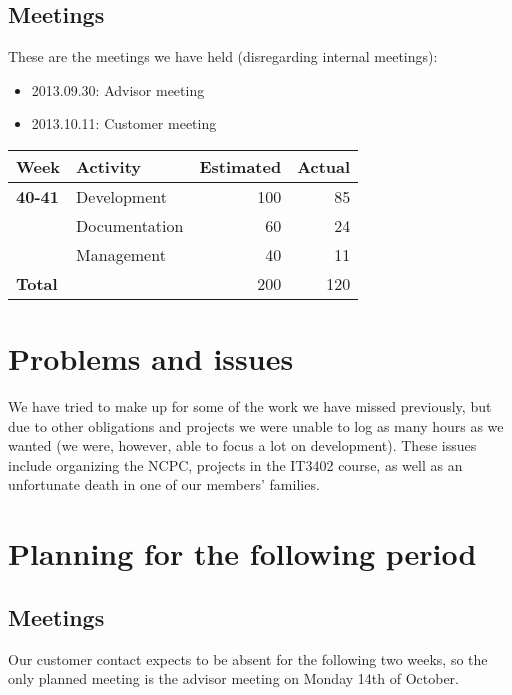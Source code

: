 \documentclass[12pt, a4paper]{article}
\begin{document}
\subsection{Meetings}
These are the meetings we have held (disregarding internal meetings):\\
\begin{itemize}
\item 2013.09.30: Advisor meeting
\item 2013.10.11: Customer meeting
\end{itemize}
  \begin{tabular}{| l | l | r | r |}
    \hline
    \textbf{Week} & \textbf{Activity} & \textbf{Estimated} & \textbf{Actual}\\ \hline
    \textbf{40-41} & Development & 100 & 85 \\ \hline
     & Documentation & 60 & 24 \\ \hline
     & Management & 40 & 11 \\ \hline
     \textbf{Total }&  & 200 & 120 \\
    \hline
  \end{tabular}

\section{Problems and issues}
We have tried to make up for some of the work we have missed previously, but due to other obligations and projects we were unable to log as many hours as we wanted (we were, however, able to focus a lot on development). These issues include organizing the NCPC, projects in the IT3402 course, as well as an unfortunate death in one of our members' families.

\section{Planning for the following period}
\subsection{Meetings}
Our customer contact expects to be absent for the following two weeks, so the only planned meeting is the advisor meeting on Monday 14th of October.
\newpage
\end{document}
